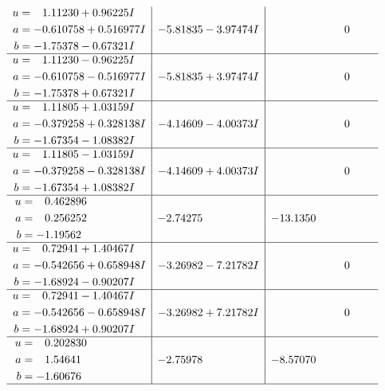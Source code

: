 \documentclass[1p]{elsarticle_modified}
\theoremstyle{definition}
\begin{document}
$$\begin{array}{c|c|c}
\begin{aligned}
u &= \phantom{-}1.11230 + 0.96225 I \\
a &= -0.610758 + 0.516977 I \\
b &= -1.75378 - 0.67321 I\end{aligned}
 & -5.81835 - 3.97474 I & \phantom{-0.000000 } 0 \\ \hline\begin{aligned}
u &= \phantom{-}1.11230 - 0.96225 I \\
a &= -0.610758 - 0.516977 I \\
b &= -1.75378 + 0.67321 I\end{aligned}
 & -5.81835 + 3.97474 I & \phantom{-0.000000 } 0 \\ \hline\begin{aligned}
u &= \phantom{-}1.11805 + 1.03159 I \\
a &= -0.379258 + 0.328138 I \\
b &= -1.67354 - 1.08382 I\end{aligned}
 & -4.14609 - 4.00373 I & \phantom{-0.000000 } 0 \\ \hline\begin{aligned}
u &= \phantom{-}1.11805 - 1.03159 I \\
a &= -0.379258 - 0.328138 I \\
b &= -1.67354 + 1.08382 I\end{aligned}
 & -4.14609 + 4.00373 I & \phantom{-0.000000 } 0 \\ \hline\begin{aligned}
u &= \phantom{-}0.462896\phantom{ +0.000000I} \\
a &= \phantom{-}0.256252\phantom{ +0.000000I} \\
b &= -1.19562\phantom{ +0.000000I}\end{aligned}
 & -2.74275\phantom{ +0.000000I} & -13.1350\phantom{ +0.000000I} \\ \hline\begin{aligned}
u &= \phantom{-}0.72941 + 1.40467 I \\
a &= -0.542656 + 0.658948 I \\
b &= -1.68924 - 0.90207 I\end{aligned}
 & -3.26982 - 7.21782 I & \phantom{-0.000000 } 0 \\ \hline\begin{aligned}
u &= \phantom{-}0.72941 - 1.40467 I \\
a &= -0.542656 - 0.658948 I \\
b &= -1.68924 + 0.90207 I\end{aligned}
 & -3.26982 + 7.21782 I & \phantom{-0.000000 } 0 \\ \hline\begin{aligned}
u &= \phantom{-}0.202830\phantom{ +0.000000I} \\
a &= \phantom{-}1.54641\phantom{ +0.000000I} \\
b &= -1.60676\phantom{ +0.000000I}\end{aligned}
 & -2.75978\phantom{ +0.000000I} & -8.57070\phantom{ +0.000000I}\\
 \hline 
 \end{array}$$\newpage\newpage\renewcommand{\arraystretch}{1}
\end{document}
